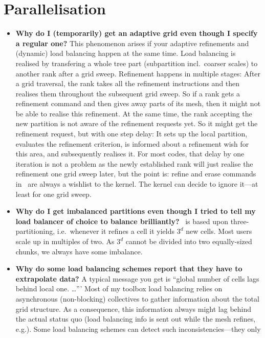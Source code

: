 \section{Parallelisation}

\begin{itemize}
  \item \textbf{Why do I (temporarily) get an adaptive grid even though I
  specify a regular one?}
  This phenomenon arises if your adaptive refinements and (dynamic) load
  balancing happen at the same time. Load balancing is realised by transfering a
  whole tree part (subpartition incl.~coarser scales) to another rank after a
  grid sweep. Refinement happens in multiple stages: After a grid traversal, the
  rank takes all the refinement instructions and then realises them throughout
  the subsequent grid sweep. So if a rank gets a refinement command and then
  gives away parts of its mesh, then it might not be able to realise this 
  refinement. At the same time, the rank accepting the new partition is not
  aware of the refinement requests yet. So it might get the refinement
  request, but with one step delay: It sets up the local partition, evaluates
  the refinement criterion, is informed about a refinement wish for this
  area, and subsequently realises it. For most codes, that delay by one
  iteration is not a problem as the newly established rank will just realise the
  refinement one grid sweep later, but the point is:
  refine and erase commands in \Peano\ are always a wishlist to the kernel. The
  kernel can decide to ignore it---at least for one grid sweep.
  \item \textbf{Why do I get imbalanced partitions even though I tried to tell
  my load balancer of choice to balance brilliantly?}
  \Peano\ is based upon three-partitioning, i.e.~whenever it refines a cell it
  yields $3^d$ new cells. Most users scale up in multiples of two. As $3^d$
  cannot be divided into two equally-sized chunks, we always have some
  imbalance.
  \item \textbf{Why do some load balancing schemes report that they have to
  extrapolate data?} 
  A typical message you get is ``global number of cells lags behind local one.
  \ldots ''' Most of my toolbox load balancing relies on asynchronous
  (non-blocking) collectives to gather information about the total grid
  structure. As a consequence, this information always might lag behind the
  actual status quo (load balancing info is sent out while the mesh refines,
  e.g.). Some load balancing schemes can detect such inconsistencies---they only

\end{itemize}
